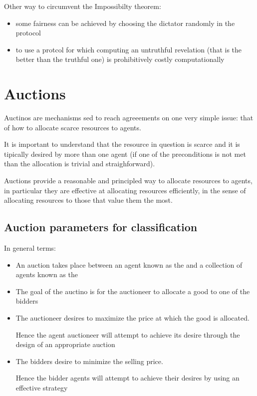 Other way to circumvent the Impossibilty theorem:
\begin{itemize}
\item some fairness can be achieved by choosing the dictator randomly in the protocol
\item to use a protcol for which computing an untruthful revelation (that is the better than the truthful one) is prohibitively costly computationally
\end{itemize}

\section{Auctions}
Auctinos are mechanisms sed to reach agreeements on one very simple issue: that of how to allocate scarce resources to agents.

It is important to understand that the resource in question is scarce and it is tipically desired by more than one agent (if one of the preconditions is not met than the allocation is trivial and straighforward).

Auctions provide a reasonable and principled way to allocate resources to agents, in particular they are effective at allocating resources efficiently, in the sense of allocating resources to those that value them the most.
\subsection{Auction parameters for classification}
In general terms:
\begin{itemize}
\item An auction takes place between an agent known as the  and a collection of agents known as the 
\item The goal of the auctino is for the auctioneer to allocate a good to one of the bidders
\item The auctioneer desires to maximize the price at which the good is allocated.

Hence the agent auctioneer will attempt to achieve its desire through the design of an appropriate auction
\item The bidders desire to minimize the selling price.

Hence the bidder agents will attempt to achieve their desires by using an effective strategy
\end{itemize}

